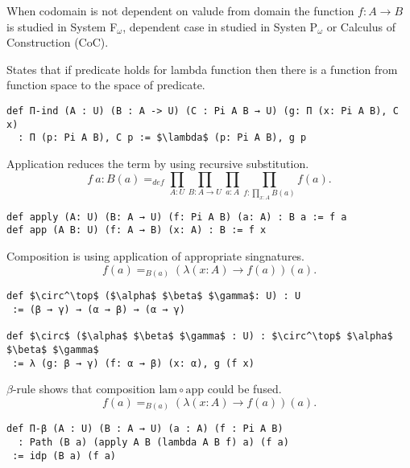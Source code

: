\documentclass{article}
\begin{document}
When codomain is not dependent on valude from domain the function $f: A \rightarrow B$
is studied in System F$_\omega$, dependent case in studied
in Systen P$_\omega$ or Calculus of Construction (CoC).

\begin{definition}
States that if predicate holds for lambda function
then there is a function from function space to the space of predicate.
\begin{lstlisting}[mathescape=true]
def П-ind (A : U) (B : A -> U) (C : Pi A B → U) (g: Π (x: Pi A B), C x)
  : П (p: Pi A B), C p := $\lambda$ (p: Pi A B), g p
\end{lstlisting}
\end{definition}

\begin{definition}[$\Pi$-Elimination]
Application reduces the term by using recursive substitution.
$$
   f\ a : B(a) =_{def} \prod_{A:U}\prod_{B: A \rightarrow U}\prod_{a:A}\prod_{f: \prod_{x:A}B(a)}f(a).
$$
\begin{lstlisting}[mathescape=true]
def apply (A: U) (B: A → U) (f: Pi A B) (a: A) : B a := f a
def app (A B: U) (f: A → B) (x: A) : B := f x
\end{lstlisting}
\end{definition}

\begin{theorem}[$\Pi$-Composition]
Composition is using application of appropriate singnatures.
$$f(a) =_{B(a)} (\lambda (x:A) \rightarrow f(a))(a).$$
\begin{lstlisting}[mathescape=true]
def $\circ^\top$ ($\alpha$ $\beta$ $\gamma$: U) : U
 := (β → γ) → (α → β) → (α → γ)

def $\circ$ ($\alpha$ $\beta$ $\gamma$ : U) : $\circ^\top$ $\alpha$ $\beta$ $\gamma$
 := λ (g: β → γ) (f: α → β) (x: α), g (f x)
\end{lstlisting}
\end{theorem}

\begin{theorem}[$\Pi$-Computation]
$\beta$-rule shows that composition $\mathrm{lam} \circ \mathrm{app}$ could be fused.
$$ f(a) =_{B(a)} (\lambda (x:A) \rightarrow f(a))(a).$$
\begin{lstlisting}[mathescape=true]
def Π-β (A : U) (B : A → U) (a : A) (f : Pi A B)
  : Path (B a) (apply A B (lambda A B f) a) (f a)
 := idp (B a) (f a)
\end{lstlisting}
\end{theorem}
\end{document}
